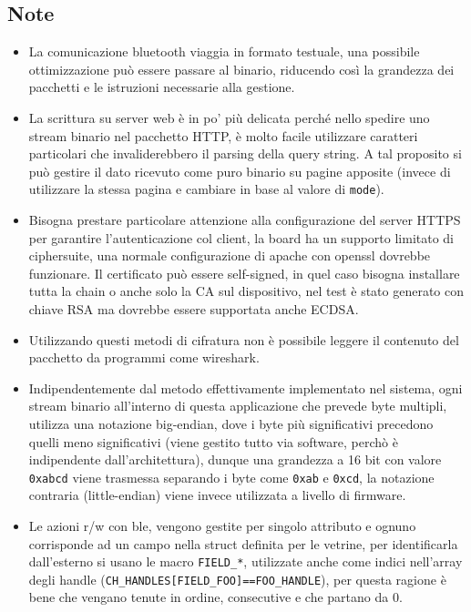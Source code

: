 \subsection{Note}
\begin{itemize}
\item La comunicazione bluetooth viaggia in formato testuale, una possibile ottimizzazione pu\`o essere passare al binario, riducendo cos\`i la grandezza dei pacchetti e le istruzioni necessarie alla gestione. 
\item La scrittura su server web \`e in po' pi\`u delicata perch\'e nello spedire uno stream binario nel pacchetto HTTP, \`e molto facile utilizzare caratteri particolari che invaliderebbero il parsing della query string. A tal proposito si pu\`o gestire il dato ricevuto come puro binario su pagine apposite (invece di utilizzare la stessa pagina e cambiare in base al valore di \texttt{mode}).
\item Bisogna prestare particolare attenzione alla configurazione del server HTTPS per garantire l'autenticazione col client, la board ha un supporto limitato di ciphersuite, una normale configurazione di apache con openssl dovrebbe funzionare. Il certificato pu\`o essere self-signed, in quel caso bisogna installare tutta la chain o anche solo la CA sul dispositivo, nel test \`e stato generato con chiave RSA ma dovrebbe essere supportata anche ECDSA.
\item Utilizzando questi metodi di cifratura non \`e possibile leggere il contenuto del pacchetto da programmi come wireshark.
\item Indipendentemente dal metodo effettivamente implementato nel sistema, ogni stream binario all'interno di questa applicazione che prevede byte multipli, utilizza una notazione big-endian, dove i byte pi\`u significativi precedono quelli meno significativi (viene gestito tutto via software, perch\`o \`e indipendente dall'architettura), dunque una grandezza a 16 bit con valore \texttt{0xabcd} viene trasmessa separando i byte come \texttt{0xab} e \texttt{0xcd}, la notazione contraria (little-endian) viene invece utilizzata a livello di firmware.
\item Le azioni r/w con ble, vengono gestite per singolo attributo e ognuno corrisponde ad un campo nella struct definita per le vetrine, per identificarla dall'esterno si usano le macro \texttt{FIELD\_*}, utilizzate anche come indici nell'array degli handle (\texttt{CH\_HANDLES[FIELD\_FOO]==FOO\_HANDLE}), per questa ragione \`e bene che vengano tenute in ordine, consecutive e che partano da 0.

\end{itemize}

